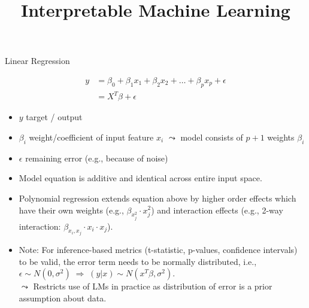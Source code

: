 \documentclass[11pt,compress,t,notes=noshow, aspectratio=169, xcolor=table]{beamer}
\title{Interpretable Machine Learning}
\date{}
\begin{document}
\newcommand{\titlefigure}{figure/whitebox}
\newcommand{\learninggoals}{
\item What characteristics does an interpretable model have?
\item Why should we use interpretable models at all?
\item Examples for interpretable models.}





\begin{frame}[c]{Linear Regression}

\begin{align*}
y &= \beta_0 + \beta_1 x_1 + \beta_2 x_2 + \dots + \beta_p x_p + \epsilon \\
 &= X^T\beta + \epsilon
\end{align*}

    \begin{itemize}
        \item $y$ target / output
        \item $\beta_i$ weight/coefficient of input feature $x_i$ $\leadsto$ model consists of $p+1$ weights $\beta_i$
        \item $\epsilon$ remaining error (e.g., because of noise)
        \item Model equation is additive and identical across entire input space.
        \pause
        \item Polynomial regression extends equation above by higher order effects which have their own weights (e.g., $\beta_{x_j^2} \cdot x_j^2$) and interaction effects (e.g., 2-way interaction: $\beta_{x_i, x_j} \cdot x_i \cdot x_j$).
        \item Note: For inference-based metrics (t-statistic, p-values, confidence intervals) to be valid, the error term needs to be normally distributed, i.e., $\epsilon \sim N(0, \sigma^2) \; \Rightarrow \; (y \vert x) \sim N(x^T \beta, \sigma^2)$.\\
$\leadsto$ Restricts use of LMs in practice as distribution of error is a prior assumption about data.
    \end{itemize}


\end{frame}
\end{document}
